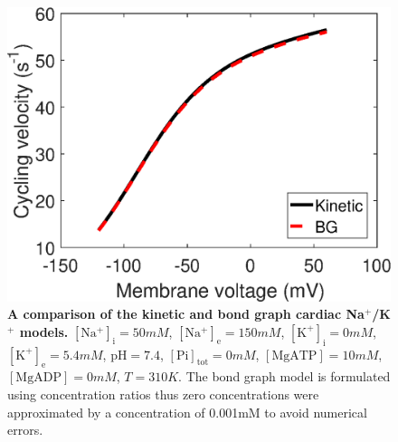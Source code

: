 \documentclass[fleqn,10pt]{physiome}
\begin{document}
\begin{figure}
	\centering
	\includegraphics[width=0.7\linewidth]{CellML_comp.eps}
	\caption{\textbf{A comparison of the kinetic and bond graph cardiac Na$^+$/K$^+$ models.} $\mathrm{[Na^+]_i} = 50\si{mM}$, $\mathrm{[Na^+]_e} = 150\si{mM}$, $\mathrm{[K^+]_i} = 0\si{mM}$, $\mathrm{[K^+]_e} = 5.4\si{mM}$, $\mathrm{pH} = 7.4$, $\mathrm{[Pi]_{tot}} = 0\si{mM}$, $\mathrm{[MgATP]} = 10\si{mM}$, $\mathrm{[MgADP]} = 0\si{mM}$, $T = 310\si{K}$.  The bond graph model is formulated using concentration ratios thus zero concentrations were approximated by a concentration of 0.001mM to avoid numerical errors.}
	\label{fig:kinetic_BG_comp}
\end{figure}
\end{document}
